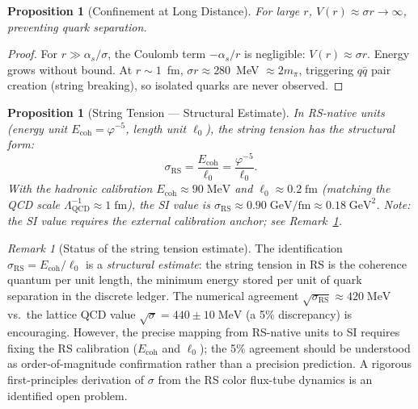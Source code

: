 \documentclass[12pt,a4paper]{article}
\newtheorem{proposition}[theorem]{Proposition}
\theoremstyle{definition}
\theoremstyle{remark}
\newtheorem{remark}[theorem]{Remark}
\begin{document}
\begin{proposition}[Confinement at Long Distance]
\label{thm:confining}
For large $r$, $V(r) \approx \sigma r \to \infty$, preventing
quark separation.
\end{proposition}

\begin{proof}
For $r \gg \alpha_s/\sigma$, the Coulomb term $-\alpha_s/r$ is
negligible: $V(r) \approx \sigma r$.  Energy grows without bound.
At $r \sim 1$~fm, $\sigma r \approx 280$~MeV $\approx 2m_\pi$,
triggering $q\bar{q}$ pair creation (string breaking), so isolated
quarks are never observed.
\end{proof}

\begin{proposition}[String Tension --- Structural Estimate]
\label{thm:sigma}
In RS-native units (energy unit $E_{\mathrm{coh}} = \varphi^{-5}$,
length unit $\ell_0$), the string tension has the structural form:
\begin{equation}
  \sigma_{\mathrm{RS}} = \frac{E_{\mathrm{coh}}}{\ell_0}
  = \frac{\varphi^{-5}}{\ell_0}.
\end{equation}
With the hadronic calibration $E_{\mathrm{coh}} \approx 90\;\mathrm{MeV}$
and $\ell_0 \approx 0.2\;\mathrm{fm}$ (matching the QCD scale
$\Lambda_{\mathrm{QCD}}^{-1} \approx 1\;\mathrm{fm}$), the SI value is
$\sigma_{\mathrm{RS}} \approx 0.90\;\mathrm{GeV/fm} \approx 0.18\;\mathrm{GeV}^2$.
Note: the SI value requires the external calibration anchor; see
Remark~\ref{rem:sigma-status}.
\end{proposition}

\begin{remark}[Status of the string tension estimate]
\label{rem:sigma-status}
The identification $\sigma_{\mathrm{RS}} = E_{\mathrm{coh}}/\ell_0$
is a \emph{structural estimate}: the string tension in RS is the
coherence quantum per unit length, the minimum energy stored per
unit of quark separation in the discrete ledger.  The numerical
agreement $\sqrt{\sigma_{\mathrm{RS}}} \approx 420\;\mathrm{MeV}$
vs.\ the lattice QCD value $\sqrt{\sigma} = 440 \pm 10\;\mathrm{MeV}$
\cite{Bali2001} (a 5\% discrepancy) is encouraging.  However, the
precise mapping from RS-native units to SI requires fixing the RS
calibration ($E_{\mathrm{coh}}$ and $\ell_0$); the 5\% agreement
should be understood as order-of-magnitude confirmation rather than
a precision prediction.  A rigorous first-principles derivation of
$\sigma$ from the RS color flux-tube dynamics is an identified open problem.
\end{remark}
\end{document}
